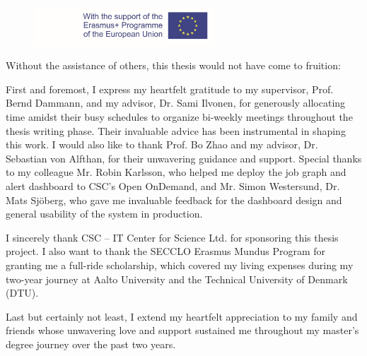\begin{figure}[tb]
  \centering
  \includegraphics[width=0.6\textwidth]{figures/EM.pdf}
\end{figure}

Without the assistance of others, this thesis would not have come to fruition:

First and foremost, I express my heartfelt gratitude to my supervisor, Prof. Bernd Dammann, and my advisor, Dr. Sami Ilvonen, for generously allocating time amidst their busy schedules to organize bi-weekly meetings throughout the thesis writing phase. Their invaluable advice has been instrumental in shaping this work. I would also like to thank Prof. Bo Zhao and my advisor, Dr. Sebastian von Alfthan, for their unwavering guidance and support. Special thanks to my colleague Mr. Robin Karlsson, who helped me deploy the job graph and alert dashboard to CSC's Open OnDemand, and Mr. Simon Westersund, Dr. Mats Sjöberg, who gave me invaluable feedback for the dashboard design and general usability of the system in production.

I sincerely thank CSC -- IT Center for Science Ltd. for sponsoring this thesis project. I also want to thank the SECCLO Erasmus Mundus Program for granting me a full-ride scholarship, which covered my living expenses during my two-year journey at Aalto University and the Technical University of Denmark (DTU).

Last but certainly not least, I extend my heartfelt appreciation to my family and friends whose unwavering love and support sustained me throughout my master's degree journey over the past two years.
